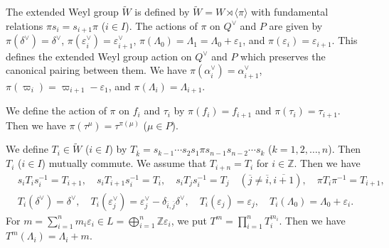 \documentclass[12pt,twoside]{article}
\newcommand\bra{\langle}
\newcommand\ket{\rangle}
\newcommand\av{\alpha^\vee}
\newcommand\eps{\varepsilon}
\newcommand\epsv{\eps^\vee}
\newcommand\deltav{\delta^\vee}
\newcommand\Qv{Q^\vee}
\newcommand\tW{{\widetilde W}}
\newcommand\Z{{\mathbb Z}} %
\theoremstyle{plain} %
\theoremstyle{definition} %
\theoremstyle{definition} %
\numberwithin{theorem}{section}
\numberwithin{equation}{section}
\numberwithin{figure}{section}
\numberwithin{table}{section}
\begin{document}
The extended Weyl group $\tW$ is defined by
$\tW = W\rtimes\bra\pi\ket$ with fundamental relations 
$\pi s_i = s_{i+1} \pi$ ($i\in I$).
The actions of $\pi$ on $\Qv$ and $P$ are given by
$\pi(\deltav)=\deltav$,
$\pi(\epsv_i)=\epsv_{i+1}$,
$\pi(\Lambda_0)=\Lambda_1=\Lambda_0+\eps_1$, and 
$\pi(\eps_i)=\eps_{i+1}$.
This defines the extended Weyl group action on $\Qv$ and $P$
which preserves the canonical pairing between them.
We have $\pi(\av_i)=\av_{i+1}$, 
$\pi(\varpi_i)=\varpi_{i+1}-\eps_1$, and
$\pi(\Lambda_i)=\Lambda_{i+1}$.

We define the action of $\pi$ on $f_i$ and $\tau_i$ by
$\pi(f_i)=f_{i+1}$ and $\pi(\tau_i)=\tau_{i+1}$.
Then we have $\pi(\tau^\mu)=\tau^{\pi(\mu)}$ ($\mu\in P$).

We define $T_i\in\tW$ ($i\in I$) by 
$T_{\overline{k}}=s_{k-1}\cdots s_2s_1\pi s_{n-1}s_{n-2}\cdots s_k$
($k=1,2,\ldots,n$).  Then $T_i$ ($i\in I$) mutually commute.
We assume that $T_{i+n}=T_i$ for $i\in\Z$.
Then we have
\begin{align*}
 &
 s_i T_i s_i^{-1} = T_{i+1}, \quad
 s_i T_{i+1} s_i^{-1} = T_i, \quad
 s_i T_j s_i^{-1} = T_j \quad (\overline{j}\ne\overline{i},\overline{i+1}), \quad
 \pi T_i \pi^{-1}= T_{i+1},
 \\ & 
 T_i(\deltav)=\deltav, \quad
 T_i(\epsv_j)=\epsv_j-\delta_{\overline{i},\overline{j}}\deltav, \quad
 T_i(\eps_j)=\eps_j, \quad
 T_i(\Lambda_0)=\Lambda_0+\eps_i.
\end{align*} 
For $m=\sum_{i=1}^nm_i\eps_i\in L=\bigoplus_{i=1}^n\Z\eps_i$,
we put $T^m = \prod_{i=1}^n T_i^{m_i}$.
Then we have $T^m(\Lambda_i)=\Lambda_i+m$.
\end{document}
